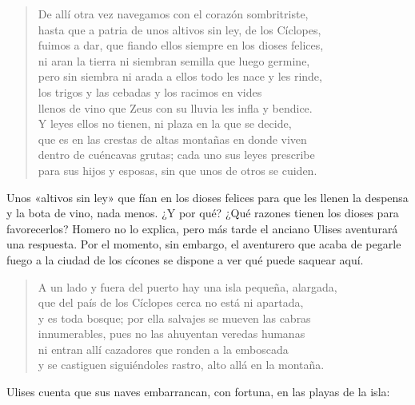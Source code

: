 \documentclass[11pt,a4paper]{article}
\begin{document}
\begin{verse}
De allí otra vez navegamos con el corazón sombritriste,\\
hasta que a patria de unos altivos sin ley, de los Cíclopes,\\
fuimos a dar, que fiando ellos siempre en los dioses felices,\\
ni aran la tierra ni siembran semilla que luego germine,\\
pero sin siembra ni arada a ellos todo les nace y les rinde,\\
los trigos y las cebadas y los racimos en vides\\
llenos de vino que Zeus con su lluvia les infla y bendice.\\
Y leyes ellos no tienen, ni plaza en la que se decide,\\
que es en las crestas de altas montañas en donde viven\\
dentro de cuéncavas grutas; cada uno sus leyes prescribe\\
para sus hijos y esposas, sin que unos de otros se cuiden.
\end{verse}

Unos «altivos sin ley» que fían en los dioses felices para que les llenen la despensa y la bota de vino, nada menos. ¿Y por qué? ¿Qué razones tienen los dioses para favorecerlos? Homero no lo explica, pero más tarde el anciano Ulises aventurará una respuesta. Por el momento, sin embargo, el aventurero que acaba de pegarle fuego a la ciudad de los cícones se dispone a ver qué puede saquear aquí.

\begin{verse}
A un lado y fuera del puerto hay una isla pequeña, alargada,\\
que del país de los Cíclopes cerca no está ni apartada,\\
y es toda bosque; por ella salvajes se mueven las cabras\\
innumerables, pues no las ahuyentan veredas humanas\\
ni entran allí cazadores que ronden a la emboscada\\
y se castiguen siguiéndoles rastro, alto allá en la montaña.
\end{verse}

Ulises cuenta que sus naves embarrancan, con fortuna, en las playas de la isla:
\end{document}
